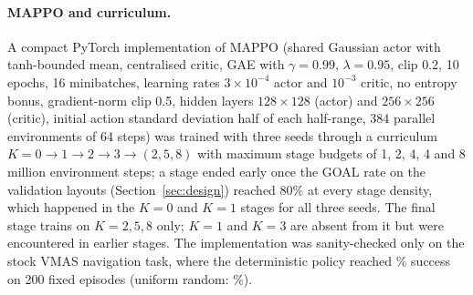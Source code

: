 \documentclass[journal]{IEEEtran}
\begin{document}
\paragraph{MAPPO and curriculum.} A compact PyTorch implementation of MAPPO \cite{yu2022mappo} (shared Gaussian actor with tanh-bounded
mean, centralised critic, GAE with $\gamma=0.99$, $\lambda=0.95$, clip 0.2, 10 epochs, 16 minibatches,
learning rates $3\times10^{-4}$ actor and $10^{-3}$ critic, no entropy bonus, gradient-norm clip 0.5,
hidden layers $128\times128$ (actor) and $256\times256$ (critic), initial action standard deviation half
of each half-range, 384 parallel environments of 64 steps) was
trained with three seeds through a curriculum $K=0\to1\to2\to3\to(2,5,8)$ with maximum stage budgets of 1, 2,
4, 4 and 8 million environment steps; a stage ended early once the GOAL rate on the validation layouts (Section~\ref{sec:design})
reached 80\% at every stage density, which happened in the $K=0$ and $K=1$ stages for all three seeds.
The final stage trains on $K=2,5,8$ only; $K=1$ and $K=3$ are absent from it but were encountered
in earlier stages. The implementation was sanity-checked only on the stock VMAS
navigation task, where the deterministic policy reached \MappoNavSuccess\% success on 200 fixed
episodes (uniform random: \MappoNavRandom\%).
\end{document}
